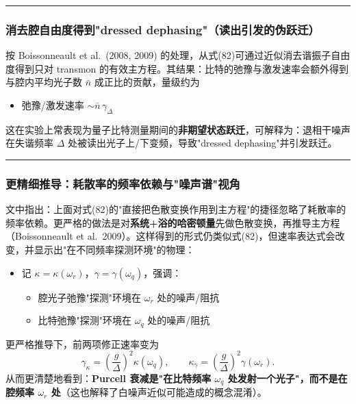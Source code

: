\documentclass[12pt,a4paper,oneside]{ctexbook}
\begin{document}
\bigskip\hrule\bigskip

\subsubsection{消去腔自由度得到"dressed dephasing"（读出引发的伪跃迁）}

按 Boissonneault et al.\ (2008, 2009) 的处理，从式(82)可通过近似消去谐振子自由度得到只对 transmon 的有效主方程。其结果：比特的弛豫与激发速率会额外得到与腔内平均光子数 $\bar n$ 成正比的贡献，量级约为

\begin{itemize}
  \item 弛豫/激发速率 $\sim \bar n\,\gamma_\Delta$
\end{itemize}

这在实验上常表现为量子比特测量期间的\textbf{非期望状态跃迁}，可解释为：退相干噪声在失谐频率 $\Delta$ 处被读出光子上/下变频，导致"dressed dephasing"并引发跃迁。

\bigskip\hrule\bigskip

\subsubsection{更精细推导：耗散率的频率依赖与"噪声谱"视角}

文中指出：上面对式(82)的"直接把色散变换作用到主方程"的捷径忽略了耗散率的频率依赖。更严格的做法是对\textbf{系统+浴的哈密顿量}先做色散变换，再推导主方程（Boissonneault et al.\ 2009）。这样得到的形式仍类似式(82)，但速率表达式会改变，并显示出"在不同频率探测环境"的物理：

\begin{itemize}
  \item 记 $\kappa=\kappa(\omega_r)$，$\gamma=\gamma(\omega_q)$，强调：
  \begin{itemize}
    \item 腔光子弛豫"探测"环境在 $\omega_r$ 处的噪声/阻抗
    \item 比特弛豫"探测"环境在 $\omega_q$ 处的噪声/阻抗
  \end{itemize}
\end{itemize}

更严格推导下，前两项修正速率变为
\begin{equation}
\gamma_\kappa=\left(\frac{g}{\Delta}\right)^2\kappa(\omega_q),\qquad
\kappa_\gamma=\left(\frac{g}{\Delta}\right)^2\gamma(\omega_r).
\end{equation}
从而更清楚地看到：\textbf{Purcell 衰减是"在比特频率 $\omega_q$ 处发射一个光子"，而不是在腔频率 $\omega_r$ 处}（这也解释了白噪声近似可能造成的概念混淆）。
\end{document}
